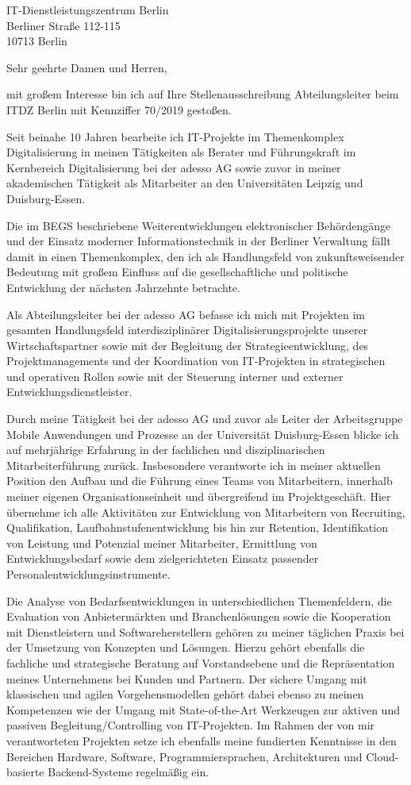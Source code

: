 \documentclass[10pt,a4paper]{dinbrief}
\date{\today}
\begin{document}
 
\begin{letter}  
{%
	IT-Dienstleistungszentrum Berlin\\
	Berliner Straße 112-115\\
	10713 Berlin
}
\subject{\bf Bewerbung Abteilungsleiter Kennziffer 70/2019}
\opening{Sehr geehrte Damen und Herren,}
mit großem Interesse bin ich auf Ihre Stellenausschreibung Abteilungsleiter beim ITDZ Berlin mit Kennziffer 70/2019 gestoßen. 

Seit beinahe 10 Jahren bearbeite ich IT-Projekte im Themenkomplex Digitalisierung in meinen Tätigkeiten als Berater und Führungskraft im Kernbereich Digitalisierung bei der adesso AG sowie zuvor in meiner akademischen Tätigkeit als Mitarbeiter an den Universitäten Leipzig und Duisburg-Essen. 

Die im BEGS beschriebene Weiterentwicklungen elektronischer Behördengänge und der Einsatz moderner Informationstechnik in der Berliner Verwaltung fällt damit in einen Themenkomplex, den ich als Handlungsfeld von zukunftsweisender Bedeutung mit großem Einfluss auf die gesellschaftliche und politische Entwicklung der nächsten Jahrzehnte betrachte.

Als Abteilungsleiter bei der adesso AG befasse ich mich mit Projekten im gesamten Handlungsfeld interdisziplinärer Digitalisierungsprojekte unserer Wirtschaftspartner sowie mit der Begleitung der Strategieentwicklung, des Projektmanagements und der Koordination von IT-Projekten in strategischen und operativen Rollen sowie mit der Steuerung interner und externer Entwicklungsdienstleister. 

Durch meine Tätigkeit bei der adesso AG und zuvor als Leiter der Arbeitsgruppe Mobile Anwendungen und Prozesse an der Universität Duisburg-Essen blicke ich auf mehrjährige Erfahrung in der fachlichen und disziplinarischen Mitarbeiterführung zurück. Insbesondere verantworte ich in meiner aktuellen Position den Aufbau und die Führung eines Teams von Mitarbeitern, innerhalb meiner eigenen Organisationseinheit und übergreifend im Projektgeschäft. Hier übernehme ich alle Aktivitäten zur Entwicklung von Mitarbeitern von Recruiting, Qualifikation, Laufbahnstufenentwicklung bis hin zur Retention, Identifikation von Leistung und Potenzial meiner Mitarbeiter, Ermittlung von Entwicklungsbedarf sowie dem zielgerichteten Einsatz passender Personalentwicklungsinstrumente.

Die Analyse von Bedarfsentwicklungen in unterschiedlichen Themenfeldern, die Evaluation von Anbietermärkten und Branchenlösungen sowie die Kooperation mit Dienstleistern und Softwareherstellern gehören zu meiner täglichen Praxis bei der Umsetzung von Konzepten und Lösungen. Hierzu gehört ebenfalls die fachliche und strategische Beratung auf Vorstandsebene und die Repräsentation meines Unternehmens bei Kunden und Partnern. Der sichere Umgang mit klassischen und agilen Vorgehensmodellen gehört dabei ebenso zu meinen Kompetenzen wie der Umgang mit State-of-the-Art Werkzeugen zur aktiven und passiven Begleitung/Controlling von IT-Projekten. Im Rahmen der von mir verantworteten Projekten setze ich ebenfalls meine fundierten Kenntnisse in den Bereichen Hardware, Software, Programmiersprachen, Architekturen und Cloud-basierte Backend-Systeme regelmäßig ein.


\end{letter}
\end{document}
